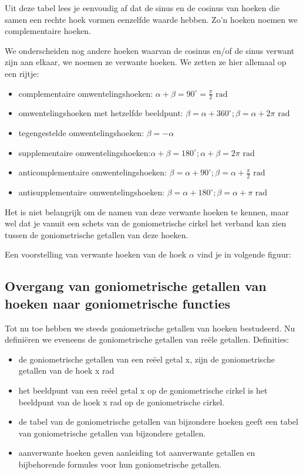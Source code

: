 Uit deze tabel lees je eenvoudig af dat de sinus en de  cosinus van hoeken die samen een rechte hoek vormen eenzelfde waarde hebben. Zo’n hoeken noemen we complementaire hoeken.

We onderscheiden nog andere hoeken waarvan de cosinus en/of de sinus verwant zijn aan elkaar, we noemen ze verwante hoeken. We zetten ze hier allemaal op een rijtje:
\begin{itemize}
	\item complementaire omwentelingshoeken: $\alpha + \beta = 90^\circ= \frac{\pi}{2} \text{ rad}$
	\item omwentelingshoeken met hetzelfde beeldpunt: $\beta = \alpha + 360^\circ; \beta = \alpha + 2 \pi \text{ rad}$
	\item tegengestelde omwentelingshoeken: $\beta = -\alpha$
	\item supplementaire omwentelingshoeken:$\alpha + \beta = 180^\circ; \alpha + \beta = 2 \pi \text{ rad}$
	\item anticomplementaire omwentelingshoeken: $\beta = \alpha + 90^\circ; \beta = \alpha + \frac{\pi}{2} \text{ rad}$
	\item antisupplementaire omwentelingshoeken: $\beta = \alpha + 180^\circ;  \beta = \alpha + \pi \text{ rad}$
\end{itemize}

Het is niet belangrijk om de namen van deze verwante hoeken te kennen, maar wel dat je vanuit een schets van de goniometrische cirkel het verband kan zien tussen de goniometrische getallen van deze hoeken.

Een voorstelling van verwante hoeken van de hoek $\alpha$ vind je in volgende figuur:


\subsection{Overgang van goniometrische getallen van hoeken naar goniometrische functies}

Tot nu toe hebben we steeds goniometrische getallen van hoeken bestudeerd.
Nu definiëren we eveneens de goniometrische getallen van reële getallen.
Definities:
\begin{itemize}
	\item de goniometrische getallen van een reëel getal x, zijn de goniometrische getallen van de hoek x rad
\item het beeldpunt van een reëel getal x op de goniometrische cirkel is het beeldpunt van de hoek x rad op de goniometrische cirkel.
\item de tabel van de goniometrische getallen van bijzondere hoeken geeft een tabel van goniometrische getallen van bijzondere getallen.
\item aanverwante hoeken geven aanleiding tot aanverwante getallen en bijbehorende formules voor hun goniometrische getallen.
\end{itemize}

